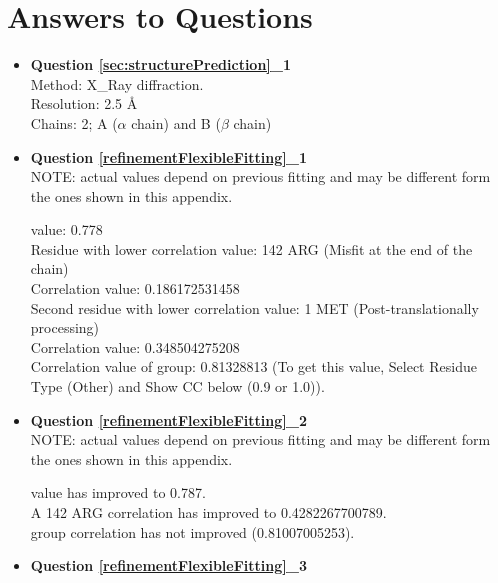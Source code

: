 \section{Answers to Questions}
\label{app:solutions}

\begin{itemize}
 \item \textbf{Question \ref{sec:structurePrediction}\_1}\\
 
Method: X\_Ray diffraction.\\
Resolution: 2.5 \AA\\
Chains: 2; A ($\alpha$ chain) and B ($\beta$ chain)\\

 \item \textbf{Question \ref{refinementFlexibleFitting}\_1}\\
 
 NOTE: actual values depend on previous fitting and may be different form the ones shown in this appendix.
 
\ccmask value: 0.778\\
Residue with lower correlation value: 142 ARG (Misfit at the end of the chain)\\
Correlation value: 0.186172531458\\
Second residue with lower correlation value: 1 MET (Post-translationally processing)\\
Correlation value: 0.348504275208\\
Correlation value of  group: 0.81328813 (To get this value, Select Residue Type (Other) and Show CC below (0.9 or 1.0)).\\

 \item \textbf{Question \ref{refinementFlexibleFitting}\_2}\\
 
 NOTE: actual values depend on previous fitting and may be different form the ones shown in this appendix.

 \ccmask value has improved to 0.787.\\
A 142 ARG correlation has improved to 0.4282267700789.\\
 group correlation has not improved (0.81007005253).\\

 \item \textbf{Question \ref{refinementFlexibleFitting}\_3}\\
 

\end{itemize}
